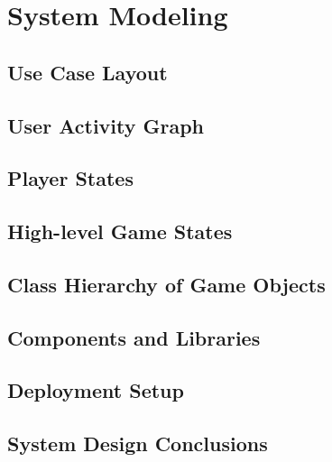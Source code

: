 \section{System Modeling}

\subsection{Use Case Layout}

\subsection{User Activity Graph}

\subsection{Player States}

\subsection{High-level Game States}

\subsection{Class Hierarchy of Game Objects}

\subsection{Components and Libraries}

\subsection{Deployment Setup}

\subsection{System Design Conclusions}

\clearpage

